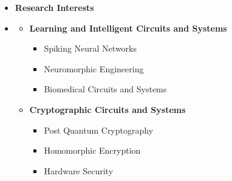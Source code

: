 \begin {itemize} \item [] {\bf \Large  Research Interests  }  \vspace{-1.5em}
\item []  {\bf \hrulefill } \mdseries \normalsize 
    \begin {itemize}
            \item [$\bullet$] \bf {\mtf \normalsize Learning and Intelligent Circuits and Systems} \mdseries
            \begin {itemize}
                \item [-]  {  Spiking Neural Networks} 
                \item [-]   {  Neuromorphic Engineering} 
                \item [-]  Biomedical Circuits and Systems
            \end {itemize} \vspace{0.3cm}

            
             \item [$\bullet$] \bf {\mtf \normalsize  Cryptographic Circuits and Systems} \mdseries
            \begin {itemize}
                \item [-]  {  Post Quantum Cryptography} 
                \item [-]   {  Homomorphic Encryption} 
                \item [-]  { Hardware Security}
            \end {itemize} \vspace{0.3cm}
    \end {itemize}
\end {itemize}



























